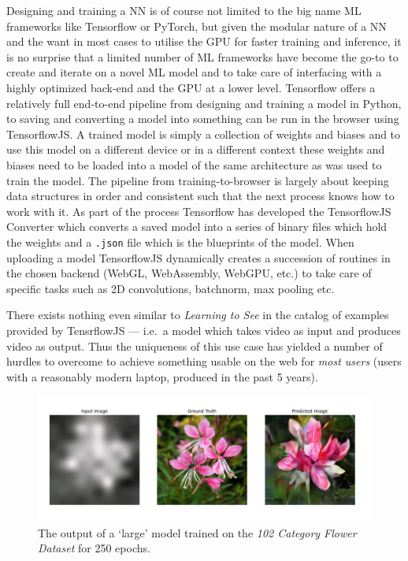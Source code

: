 \documentclass{article}
\begin{document}
Designing and training a NN is of course not limited to the big name ML frameworks like Tensorflow\cite{tf} or PyTorch\cite{pytorch}, but given the modular nature of a NN and the want in most cases to utilise the GPU for faster training and inference, it is no surprise that a limited number of ML frameworks have become the go-to to create and iterate on a novel ML model and to take care of interfacing with a highly optimized back-end and the GPU at a lower level. Tensorflow offers a relatively full end-to-end pipeline from designing and training a model in Python, to saving and converting a model into something can be run in the browser using TensorflowJS\cite{tfjs}. A trained model is simply a collection of weights and biases and to use this model on a different device or in a different context these weights and biases need to be loaded into a model of the same architecture as was used to train the model. The pipeline from training-to-browser is largely about keeping data structures in order and consistent such that the next process knows how to work with it. As part of the process Tensorflow has developed the TensorflowJS Converter\cite{tfjs_converter} which converts a saved model into a series of binary files which hold the weights and a \verb|.json| file which is the blueprints of the model. When uploading a model TensorflowJS dynamically creates a succession of routines in the chosen backend (WebGL, WebAssembly, WebGPU, etc.) to take care of specific tasks such as 2D convolutions, batchnorm, max pooling etc.

There exists nothing even similar to \textit{Learning to See} in the catalog of examples provided by TensrflowJS --- i.e.\ a model which takes video as input and produces video as output. Thus the uniqueness of this use case has yielded a number of hurdles to overcome to achieve something usable on the web for \textit{most users} (users with a reasonably modern laptop, produced in the past 5 years).

\begin{figure}[h!]
	\centering
	\includegraphics[width=\textwidth]{250_epochs}
	\caption{The output of a `large' model trained on the \textit{102 Category Flower Dataset}\cite{flowers_dataset} for 250 epochs.}
\end{figure}
\end{document}
